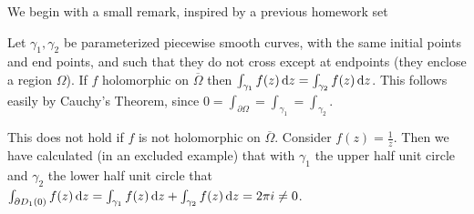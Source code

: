 \setcounter{section}{0}
\setcounter{theorem}{0}


We begin with a small remark, inspired by a previous homework set

\begin{remark}
Let $\gamma_1, \gamma_2$ be parameterized piecewise smooth curves, with the same initial points and end points, and such that they do not cross except at endpoints (they enclose a region $\Omega$). If $f$ holomorphic on $\overline{\Omega}$ then $\int_{\gamma_1}f(z) \dif z = \int_{\gamma_2} f(z) \dif z$. This follows easily by Cauchy's Theorem, since $0 = \int_{\partial \Omega} = \int_{\gamma_1} = \int_{\gamma_2}$.

\begin{center}
\end{center}


This does not hold if $f$ is not holomorphic on $\overline{\Omega}$. Consider $f(z)= \frac{1}{z}$. Then we have calculated (in an excluded example) that with $\gamma_1$ the upper half unit circle and $\gamma_2$ the lower half unit circle that $\int_{\partial D_1(0)} f(z) \dif z = \int_{\gamma_1} f(z) \dif z + \int_{\gamma_2} f(z) \dif z = 2\pi i \neq 0$.
\end{remark}




